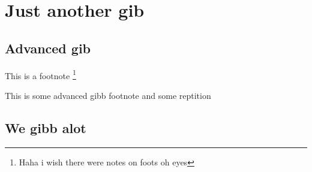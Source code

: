 \chapter{Just another gib}
\section{Advanced gib}
This is a footnote \footnote{Haha i wish there were notes on foots oh eyes}

This is some advanced gibb footnote \footnotemark and some reptition \footnotemark[\value{footnote}]

\section{We gibb alot}